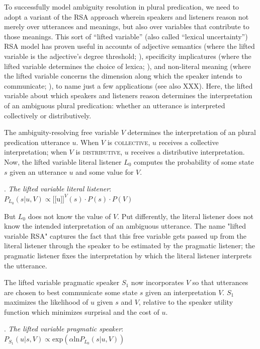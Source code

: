 \documentclass[linguex]{sp}
\newcommand{\sem}[1]{\mbox{$[\![$#1$]\!]$}}
\begin{document}
To successfully model ambiguity resolution in plural predication, we need to adopt a variant of the RSA approach wherein speakers and listeners reason not merely over utterances and meanings, but also over variables that contribute to those meanings. This sort of ``lifted variable'' (also called ``lexical uncertainty'') RSA model has proven useful in accounts of adjective semantics (where the lifted variable is the adjective's degree threshold; \citealp{lassitergoodman2013}), specificity implicatures (where the lifted variable determines the choice of lexica; \citealp{bergenetal2012}), and non-literal meaning (where the lifted variable concerns the dimension along which the speaker intends to communicate; \citealp{kaoetal2014}), to name just a few applications (see also XXX). Here, the lifted variable about which speakers and listeners reason determines the interpretation of an ambiguous plural predication: whether an utterance is interpreted collectively or distributively.

The ambiguity-resolving free variable $V$ determines the interpretation of an plural predication utterance $u$. When $V$ is \textsc{collective}, $u$ receives a collective interpretation; when $V$ is \textsc{distributive}, $u$ receives a distributive interpretation. Now, the lifted variable literal listener $L_{0}$ computes the probability of some state $s$ given an utterance $u$ and some value for $V$. 

\ex. \emph{The lifted variable literal listener}:\\
$P_{L_{0}}(s|u,V) \propto \sem{u}^{V}(s) \cdot P(s) \cdot P(V)$

But $L_{0}$ does not know the value of $V$. Put differently, the literal listener does not know the intended interpretation of an ambiguous utterance. The name "lifted variable RSA" captures the fact that this free variable gets passed up from the literal listener through the speaker to be estimated by the pragmatic listener; the pragmatic listener fixes the interpretation by which the literal listener interprets the utterance.

The lifted variable pragmatic speaker $S_{1}$ now incorporates $V$ so that utterances are chosen to best communicate some state $s$ given an interpretation $V$. $S_{1}$ maximizes the likelihood of $u$ given $s$ and $V$, relative to the speaker utility function which minimizes surprisal and the cost of $u$.

\ex. \emph{The lifted variable pragmatic speaker}:\\
$P_{S_{1}}(u|s,V) \propto \textrm{exp}(\alpha\textrm{ln}P_{L_{0}}(s|u,V))$
\end{document}

